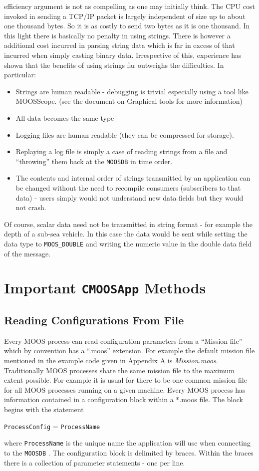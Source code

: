 \documentclass[a4paper,10pt]{article}
\newcommand{\Code}[1]{\texttt{#1} }
\newcommand{\code}[1]{\Code{#1} }
\newcommand{\DB}   {\code{{MOOSDB}}}
\begin{document}
efficiency argument is not as compelling as one may initially
think. The CPU cost invoked in sending a TCP/IP packet is largely
independent of size up to about one thousand bytes. So it is as
costly to send two bytes as it is one thousand. In this light
there is basically no penalty in using strings. There is however a
additional cost incurred in parsing string data which is far in
excess of that incurred when simply casting binary data.
Irrespective of this, experience has shown that the benefits of
using strings far outweighs the difficulties. In particular:
\begin{itemize}
\item Strings are human readable - debugging is trivial especially
using a tool like MOOSScope. (see the document on Graphical tools for more information)
\item All data becomes the same type
\item Logging files are human readable (they can be compressed for
storage).
\item Replaying a log file is simply a case of reading strings from
a file and ``throwing'' them back at the \DB in time order.
\item The contents and internal order of strings transmitted by an application can be changed
without the need to recompile consumers (subscribers to that data)
- users simply would not understand new data fields but they would
not crash.
\end{itemize}
Of course, scalar data need not be transmitted in string format -
for example the depth of a sub-sea vehicle. In this case the data
would be sent while setting the data type to  \verb"MOOS_DOUBLE"
and writing the numeric value in the double data field of the
message.


\section{Important \code{CMOOSApp} Methods}


\subsection{Reading Configurations From File}\label{Sec:App:Configuration}

Every MOOS process can read configuration parameters from a
``Mission file'' which by convention has a ``.moos'' extension.
For example the default mission file mentioned in the example code
given in Appendix A is {\it{Mission.moos}}. Traditionally MOOS
processes share  the same mission file to the maximum extent
possible. For example it is usual for there to be one common
mission file for all MOOS processes running on a given machine.
Every MOOS process has information contained in a configuration
block within a *.moos file. The block begins with the statement
\begin{center}
\code{ProcessConfig} = \code{ProcessName}
\end{center}
where {\code{ProcessName}} is the unique name the application will
use when connecting to the \DB. The configuration block is
delimited by braces. Within the braces there is a collection of
parameter statements - one per line.
\end{document}
